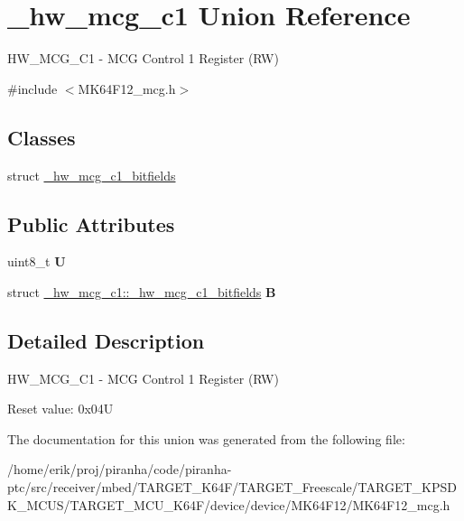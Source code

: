 \hypertarget{union__hw__mcg__c1}{}\section{\+\_\+hw\+\_\+mcg\+\_\+c1 Union Reference}
\label{union__hw__mcg__c1}


H\+W\+\_\+\+M\+C\+G\+\_\+\+C1 -\/ M\+CG Control 1 Register (RW)  




{\ttfamily \#include $<$M\+K64\+F12\+\_\+mcg.\+h$>$}

\subsection*{Classes}
\begin{DoxyCompactItemize}
\item 
struct \hyperlink{struct__hw__mcg__c1_1_1__hw__mcg__c1__bitfields}{\+\_\+hw\+\_\+mcg\+\_\+c1\+\_\+bitfields}
\end{DoxyCompactItemize}
\subsection*{Public Attributes}
\begin{DoxyCompactItemize}
\item 
uint8\+\_\+t {\bfseries U}\hypertarget{union__hw__mcg__c1_acc8a4eb53a2ba9a5c75ebfdeacfc1e74}{}\label{union__hw__mcg__c1_acc8a4eb53a2ba9a5c75ebfdeacfc1e74}

\item 
struct \hyperlink{struct__hw__mcg__c1_1_1__hw__mcg__c1__bitfields}{\+\_\+hw\+\_\+mcg\+\_\+c1\+::\+\_\+hw\+\_\+mcg\+\_\+c1\+\_\+bitfields} {\bfseries B}\hypertarget{union__hw__mcg__c1_a1b39ab9677a907ed88f9e355025d67cc}{}\label{union__hw__mcg__c1_a1b39ab9677a907ed88f9e355025d67cc}

\end{DoxyCompactItemize}


\subsection{Detailed Description}
H\+W\+\_\+\+M\+C\+G\+\_\+\+C1 -\/ M\+CG Control 1 Register (RW) 

Reset value\+: 0x04U 

The documentation for this union was generated from the following file\+:\begin{DoxyCompactItemize}
\item 
/home/erik/proj/piranha/code/piranha-\/ptc/src/receiver/mbed/\+T\+A\+R\+G\+E\+T\+\_\+\+K64\+F/\+T\+A\+R\+G\+E\+T\+\_\+\+Freescale/\+T\+A\+R\+G\+E\+T\+\_\+\+K\+P\+S\+D\+K\+\_\+\+M\+C\+U\+S/\+T\+A\+R\+G\+E\+T\+\_\+\+M\+C\+U\+\_\+\+K64\+F/device/device/\+M\+K64\+F12/M\+K64\+F12\+\_\+mcg.\+h\end{DoxyCompactItemize}
